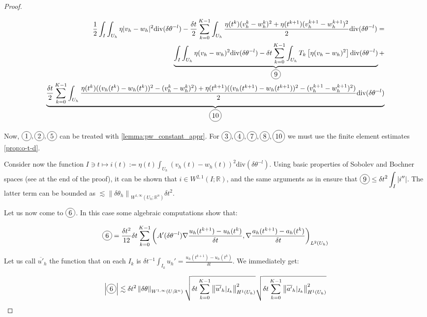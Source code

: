 \documentclass[english,a4paper,9pt,oneside]{scrbook}	%
\theoremstyle{break}
\newenvironment{mproof}[1][\proofname]{%
  \begin{proof}[#1]$ $\par\nobreak\ignorespaces
}{%
  \end{proof}
}
\renewcommand*{\proofname}{Proof}
\theoremstyle{remark}
\newcommand{\mR}{\mathbb{R}}
\newcommand{\ds}{\displaystyle}
\newcommand{\norm}[1]{\left\lVert#1\right\rVert}
\newcommand{\te}{\theta}
\newcommand{\dive}{\text{div}}
\newcommand*\circled[1]{\tikz[baseline=(char.base)]{
            \node[shape=circle,draw,inner sep=2pt] (char) {#1};}}
\begin{document}
\begin{mproof}
\begin{align*}
\frac{1}{2} \int_I \int_{U_h} \eta |v_h-w_h|^2\dive(\delta \te^{-l}) - \frac{\delta t}{2} \sum_{k=0}^{K-1} \int_{U_h}\frac{\eta(t^k)(v_h^k-w_h^k)^2 + \eta(t^{k+1})(v_h^{k+1}-w_h^{k+1})^2}{2}\dive(\delta \te^{-l}) = \\
\underbrace{\int_I \int_{U_h}\eta(v_h-w_h)^2\dive(\delta \te^{-l}) - \delta t \sum_{k=0}^{K-1}\int_{U_h} T_k \left [ \eta(v_h-w_h)^2 \right] \dive(\delta \te^{-l})}_{\circled{9}} +\\
\underbrace{\frac{\delta t}{2} \sum_{k=0}^{K-1} \int_{U_h}\frac{\eta(t^k)((v_h(t^k)-w_h(t^k))^2- (v_h^k-w_h^k)^2) + \eta(t^{k+1})((v_h(t^{k+1})-w_h(t^{k+1}))^2 -(v_h^{k+1}-w_h^{k+1})^2)}{2}\dive(\delta \te^{-l})}_{\circled{10}}
\end{align*}

Now, $\circled{1}, \circled{2}, \circled{5}$ can be treated with \cref{lemma:pw_constant_appr}.
For $\circled{3}, \circled{4}, \circled{7}, \circled{8}, \circled{10}$ we must use the finite element estimates \cref{prop:o-t-d}.

Consider now the function $I \ni t \mapsto \ds i(t):= \eta(t)\int_{U_h}(v_h(t)-w_h(t))^2\dive(\delta \te^{-l})$. Using basic properties of Sobolev and Bochner spaces (see at the end of the proof), it can be shown that $i \in W^{2,1}(I; \mR)$, and the same arguments as in \cite{trapezoidal} ensure that $\ds\circled{9} \leq \delta t^2 \int_I |i''|$. The latter term can be bounded as $\lesssim \norm{\delta \te_h}_{W^{1,\infty}(U_h;\mR^n)} \delta t^2$.


Let us now come to $\circled{6}$. In this case some algebraic computations show that:

\begin{align*}
\circled{6} = \frac{\delta t^2}{12} \delta t \sum_{k=0}^{K-1} \left ( A'(\delta \te^{-l}) \nabla \frac{u_h(t^{k+1})-u_h(t^{k})}{\delta t}, \nabla  \frac{a_h(t^{k+1})-a_h(t^{k})}{\delta t} \right )_{L^2(U_h)}
\end{align*}

Let us call $\overline{u'}_h$ the function that on each $I_k$ is $\delta t^{-1}\ds \int_{I_k} u_h' = \frac{u_h(t^{k+1})-u_h(t^{k})}{\delta t}$. We immediately get:

\begin{align*}
\left | \circled{6} \right | \lesssim \delta t^2 \ds \norm{\delta \te}_{W^{1,\infty}(U;\mR^n)}\sqrt{\delta t \sum_{k=0}^{K-1} \norm{{\overline{u'}_h}|_{I_k}}_{H^1(U_h)}^2}\sqrt{\delta t \sum_{k=0}^{K-1} \norm{{\overline{a'}_h}|_{I_k}}_{H^1(U_h)}^2}
\end{align*}


\end{mproof}
\end{document}
